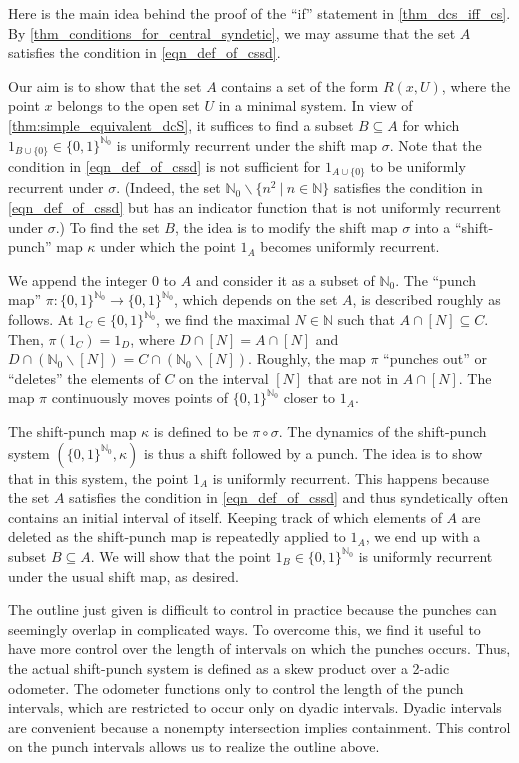 \documentclass[letter,11pt]{article}
\theoremstyle{plain}
\theoremstyle{definition}
\theoremstyle{plain}
\theoremstyle{plain}
\numberwithin{equation}{section}
\newcommand{\N}{\mathbb{N}}
\renewcommand{\setminus}{\backslash}
\begin{document}
Here is the main idea behind the proof of the ``if'' statement in \cref{thm_dcs_iff_cs}.  By \cref{thm_conditions_for_central_syndetic}, we may assume that the set $A$ satisfies the condition in \eqref{eqn_def_of_cssd}.

Our aim is to show that the set $A$ contains a set of the form $R(x,U)$, where the point $x$ belongs to the open set $U$ in a minimal system.  In view of \cref{thm:simple_equivalent_dcS}, it suffices to find a subset $B \subseteq A$ for which $1_{B \cup \{0\}} \in \{0, 1\}^{\N_0}$ is uniformly recurrent under the shift map $\sigma$.  Note that the condition in \eqref{eqn_def_of_cssd} is not sufficient for $1_{A \cup \{0\}}$ to be uniformly recurrent under $\sigma$.  (Indeed, the set $\N_0 \setminus \{n^2 \ | \ n \in \N\}$ satisfies the condition in \eqref{eqn_def_of_cssd} but has an indicator function that is not uniformly recurrent under $\sigma$.)  To find the set $B$, the idea is to modify the shift map $\sigma$ into a ``shift-punch'' map $\kappa$ under which the point $1_A$ becomes uniformly recurrent.


We append the integer $0$ to $A$ and consider it as a subset of $\N_0$. The ``punch map'' $\pi: \{0,1\}^{\N_0} \to \{0,1\}^{\N_0}$, which depends on the set $A$, is described roughly as follows.  At $1_C \in \{0,1\}^{\N_0}$, we find the maximal $N \in \N$ such that $A \cap [N] \subseteq C$.  Then, $\pi(1_C) = 1_D$, where $D \cap [N] = A \cap [N]$ and $D \cap (\N_0 \setminus [N]) = C \cap (\N_0 \setminus [N])$.  Roughly, the map $\pi$ ``punches out'' or ``deletes'' the elements of $C$ on the interval $[N]$ that are not in $A \cap [N]$.  The map $\pi$ continuously moves points of $\{0,1\}^{\N_0}$ closer to $1_A$.

The shift-punch map $\kappa$ is defined to be $\pi \circ \sigma$.  The dynamics of the shift-punch system $(\{0,1\}^{\N_0}, \kappa)$ is thus a shift followed by a punch.  The idea is to show that in this system, the point $1_A$ is uniformly recurrent.  This happens because the set $A$ satisfies the condition in \eqref{eqn_def_of_cssd} and thus syndetically often contains an initial interval of itself.  Keeping track of which elements of $A$ are deleted as the shift-punch map is repeatedly applied to $1_A$, we end up with a subset $B \subseteq A$. We will show that the point $1_B \in \{0,1\}^{\N_0}$ is uniformly recurrent under the usual shift map, as desired.


The outline just given is difficult to control in practice because the punches can seemingly overlap in complicated ways.  To overcome this, we find it useful to have more control over the length of intervals on which the punches occurs.  Thus, the actual shift-punch system is defined as a skew product over a 2-adic odometer.  The odometer functions only to control the length of the punch intervals, which are restricted to occur only on dyadic intervals.  Dyadic intervals are convenient because a nonempty intersection implies containment.  This control on the punch intervals allows us to realize the outline above.
\end{document}
